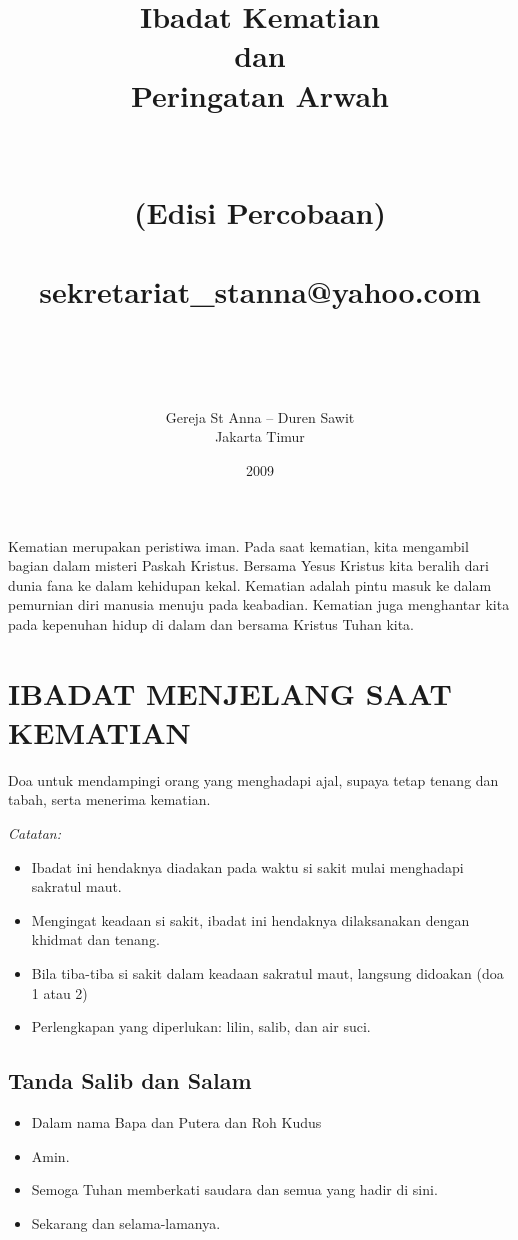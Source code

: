 \documentclass[10pt,a5paper,fancyhdr]{memoir}
\author{Gereja St Anna -- Duren Sawit \\  
Jakarta Timur}
\title{Ibadat Kematian\\ 
dan \\
Peringatan Arwah \\
{~}\\
\vspace{2cm}
~\\
(Edisi Percobaan) \\
~\\
sekretariat\_stanna@yahoo.com \\
~\\
~\\
}
\date{2009}
\newcommand{\BU}[1]{\begin{itemize}\itemsep0pt \item[U:] #1 \end{itemize}}
\newcommand{\BP}[1]{\begin{itemize}\itemsep0pt \item[P:] #1 \end{itemize}}
\begin{document}
\pagestyle{Ruled}
\begin{titlingpage}
\maketitle
\end{titlingpage}

Kematian merupakan peristiwa iman. Pada saat kematian, kita mengambil 
bagian dalam misteri Paskah Kristus. Bersama Yesus Kristus kita beralih 
dari dunia fana ke dalam kehidupan kekal. Kematian adalah pintu masuk ke 
dalam pemurnian diri manusia menuju pada keabadian. Kematian juga 
menghantar kita pada kepenuhan hidup di dalam dan bersama Kristus 
Tuhan kita. 

 



\renewcommand{\cftchapterfont}{\normalfont\rmfamily}   
\renewcommand{\cftsectionfont}{\normalfont\rmfamily}   
\newpage
\tableofcontents



\chapter{IBADAT MENJELANG SAAT KEMATIAN}

Doa untuk mendampingi orang yang menghadapi ajal, supaya tetap 
tenang dan tabah, serta menerima kematian. 

\itshape
Catatan: 
\begin{itemize} \itemsep0pt
\item Ibadat ini hendaknya diadakan pada waktu si sakit mulai 
menghadapi sakratul maut. 
\item Mengingat keadaan si sakit, ibadat ini hendaknya dilaksanakan 
dengan khidmat dan tenang. 
\item Bila tiba-tiba si sakit dalam keadaan sakratul maut, langsung 
didoakan (doa 1 atau 2) 
\item Perlengkapan yang diperlukan: lilin, salib, dan air suci.
\end{itemize}

\normalfont
 
\section*{Tanda Salib dan Salam} 

\BP{Dalam nama Bapa dan Putera dan Roh Kudus}
\BU{Amin.} 
\BP{Semoga Tuhan memberkati saudara dan semua yang hadir di sini.} 
\BU{Sekarang dan selama-lamanya.}
 
\end{document}
